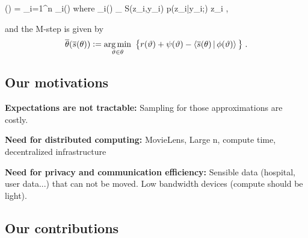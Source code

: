 \documentclass[11pt]{article}
\theoremstyle{t}
\begin{document}
\beq \label{eq:estep}
(\theta) = \sum_{i=1}^n _i(\theta) \quad \textrm{where} \quad {}_i(\theta) \eqdef \int_{\Zset} S(z_i,y_i) p(z_i|y_i;\theta) \rmd z_i \eqsp,
\eeq

and the {M-step} is given by
\begin{align}\label{eq:mstep}
\overline{\theta}( \overline{s}(\theta) ) \mathrel{\mathop:}= \mathop{\mathrm{arg\,min}}_{ \vartheta \in \theta } ~\big\{ r( \vartheta ) + \psi( \vartheta) - \left\langle \overline{s}(\theta)\,|\, \phi ( \vartheta)  \right\rangle \big\} \;.
\end{align}

\subsection{Our motivations}

\textbf{Expectations are not tractable:} Sampling for those approximations are costly.


\textbf{Need for distributed computing: } MovieLens, Large n, compute time, decentralized infrastructure


\textbf{Need for privacy and communication efficiency: } Sensible data (hospital, user data...) that can not be moved. Low bandwidth devices (compute should be light).


\subsection{Our contributions}
\end{document}
